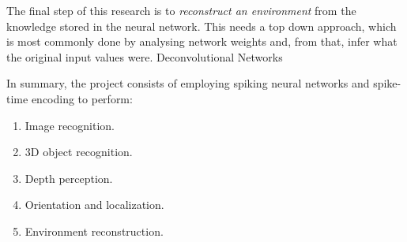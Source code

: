 The final step of this research is to \emph{reconstruct an environment} from the knowledge stored in the neural network. This needs a top down approach, which is most commonly done by analysing network weights and, from that, infer what the original input values were. 
Deconvolutional Networks

In summary, the project consists of employing spiking neural networks and spike-time encoding to perform:
\begin{enumerate}
  \item Image recognition.
  \item 3D object recognition.
  \item Depth perception.
  \item Orientation and localization.
  \item Environment reconstruction.
\end{enumerate}